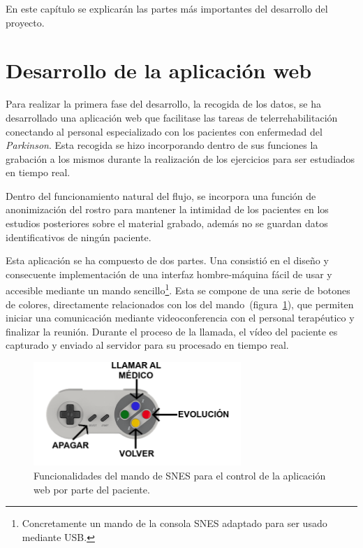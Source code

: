 \label{cap:relevantes}

En este capítulo se explicarán las partes más importantes del desarrollo del proyecto.

\section{Desarrollo de la aplicación web}

Para realizar la primera fase del desarrollo, la recogida de los datos, se ha desarrollado una aplicación web que facilitase las tareas de telerrehabilitación conectando al personal especializado con los pacientes con enfermedad del \textit{Parkinson}. Esta recogida se hizo incorporando dentro de sus funciones la grabación a los mismos durante la realización de los ejercicios para ser estudiados en tiempo real. 

Dentro del funcionamiento natural del flujo, se incorpora una función de anonimización del rostro para mantener la intimidad de los pacientes en los estudios posteriores sobre el material grabado, además no se guardan datos identificativos de ningún paciente.

Esta aplicación se ha compuesto de dos partes. Una consistió en el diseño y consecuente implementación de una interfaz hombre-máquina fácil de usar y accesible mediante un mando sencillo\footnote{Concretamente un mando de la consola SNES adaptado para ser usado mediante USB.}. Esta se compone de una serie de botones de colores, directamente relacionados con los del mando~(figura~\ref{fig:help}), que permiten iniciar una comunicación mediante videoconferencia con el personal terapéutico y finalizar la reunión. Durante el proceso de la llamada, el vídeo del paciente es capturado y enviado al servidor para su procesado en tiempo real.

\begin{figure}
	\centering
	\includegraphics[width=0.7\textwidth]{img/ayuda.png}
	\caption{Funcionalidades del mando de SNES para el control de la aplicación web por parte del paciente.}
	\label{fig:help}
\end{figure}


